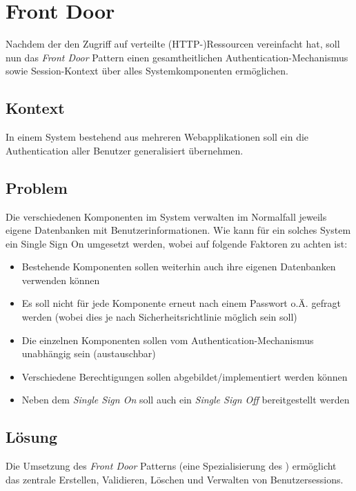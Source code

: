 \section{Front Door}

Nachdem der  den Zugriff auf verteilte (HTTP-)Ressourcen vereinfacht hat, soll nun das \emph{Front Door} Pattern einen gesamtheitlichen Authentication-Mechanismus sowie Session-Kontext über alles Systemkomponenten ermöglichen.

\subsection*{Kontext}
In einem System bestehend aus mehreren Webapplikationen soll ein  die Authentication aller Benutzer generalisiert übernehmen.

\subsection*{Problem}
Die verschiedenen Komponenten im System verwalten im Normalfall jeweils eigene Datenbanken mit Benutzerinformationen. Wie kann für ein solches System ein Single Sign On umgesetzt werden, wobei auf folgende Faktoren zu achten ist:

\begin{itemize}
	\item Bestehende Komponenten sollen weiterhin auch ihre eigenen Datenbanken verwenden können
	\item Es soll nicht für jede Komponente erneut nach einem Passwort o.Ä. gefragt werden (wobei dies je nach Sicherheitsrichtlinie möglich sein soll)
	\item Die einzelnen Komponenten sollen vom Authentication-Mechanismus unabhängig sein (austauschbar)
	\item Verschiedene Berechtigungen sollen abgebildet/implementiert werden können
	\item Neben dem \emph{Single Sign On} soll auch ein \emph{Single Sign Off} bereitgestellt werden
\end{itemize}


\subsection*{Lösung}
Die Umsetzung des \emph{Front Door} Patterns (eine Spezialisierung des ) ermöglicht das zentrale Erstellen, Validieren, Löschen und Verwalten von Benutzersessions.

